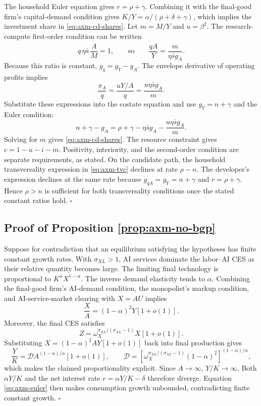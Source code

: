 The household Euler equation gives \(r=\rho+\gamma\). Combining it with the
final-good firm's capital-demand condition gives
\(K/Y=\alpha/(\rho+\delta+\gamma)\), which implies the investment share in
\eqref{eq:axm-cd-shares}. Let \(m=M/Y\) and
\(u=\beta^2\). The research-compute first-order condition can be written
\[
 q\,\eta\bar s\,\frac{\dot A}{M}=1,
 \qquad\text{so}\qquad
 \frac{qA}{Y}=\frac{m}{\eta\bar s g_A}.
\]
Because this ratio is constant, \(g_q=g_Y-g_A\). The envelope derivative of
operating profits implies
\[
 \frac{\pi_A}{q}
 =\frac{uY/A}{q}
 =\frac{u\eta\bar s g_A}{m}.
\]
Substitute these expressions into the costate equation and use
\(g_Y=n+\gamma\) and the Euler condition:
\[
 n+\gamma-g_A
 =\rho+\gamma-\eta\bar s g_A
  -\frac{u\eta\bar s g_A}{m}.
\]
Solving for \(m\) gives \eqref{eq:axm-cd-shares}. The resource constraint gives
\(c=1-u-i-m\). Positivity, interiority, and the second-order condition are
separate requirements, as stated. On the candidate path, the
household transversality expression in \eqref{eq:axm-tvc} declines at rate
\(\rho-n\). The developer's expression declines at the same rate because
\(g_{qA}=g_Y=n+\gamma\) and \(r=\rho+\gamma\). Hence \(\rho>n\) is sufficient
for both transversality conditions once the stated constant ratios hold.
\(\square\)

\subsection{Proof of Proposition \ref{prop:axm-no-bgp}}

Suppose for contradiction that an equilibrium satisfying the hypotheses has
finite constant growth rates. With \(\sigma_{XL}>1\), AI services dominate the
labor--AI CES as their relative quantity becomes large. The limiting final technology is
proportional to \(K^\alpha X^{1-\alpha}\). The inverse demand elasticity tends
to \(\alpha\). Combining the final-good firm's AI-demand condition, the
monopolist's markup condition, and AI-service-market clearing with \(X=AU\)
implies
\[
 \frac{X}{A}=(1-\alpha)^2Y[1+o(1)].
\]
Moreover, the final CES satisfies
\[
 Z=\omega_X^{\sigma_{XL}/(\sigma_{XL}-1)}X[1+o(1)].
\]
Substituting \(X=(1-\alpha)^2AY[1+o(1)]\) back into final production gives
\[
 \frac{Y}{K}=\mathcal D A^{(1-\alpha)/\alpha}[1+o(1)],\qquad
 \mathcal D=
 \left[\omega_X^{\sigma_{XL}/(\sigma_{XL}-1)}
 (1-\alpha)^2\right]^{(1-\alpha)/\alpha},
\]
which makes the claimed proportionality explicit. Since \(A\to\infty\),
\(Y/K\to\infty\). Both \(\alpha Y/K\) and the net interest rate
\(r=\alpha Y/K-\delta\) therefore diverge. Equation \eqref{eq:axm-euler} then
makes consumption growth unbounded, contradicting finite constant growth.
\(\square\)

